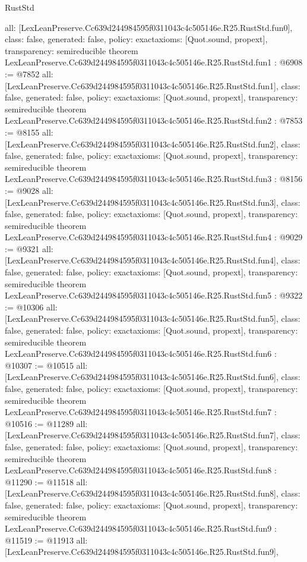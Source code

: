 \begin{lexlean}{RustStd}
\begin{coremodule}
{  all: [LexLeanPreserve.Cc639d244984595f0311043c4c505146e.R25.RustStd.fun0],
  class: false,
  generated: false,
  policy: exact{axioms: [Quot.sound, propext]},
  transparency: semireducible
}
theorem LexLeanPreserve.Cc639d244984595f0311043c4c505146e.R25.RustStd.fun1 : @6908 := @7852 {
  all: [LexLeanPreserve.Cc639d244984595f0311043c4c505146e.R25.RustStd.fun1],
  class: false,
  generated: false,
  policy: exact{axioms: [Quot.sound, propext]},
  transparency: semireducible
}
theorem LexLeanPreserve.Cc639d244984595f0311043c4c505146e.R25.RustStd.fun2 : @7853 := @8155 {
  all: [LexLeanPreserve.Cc639d244984595f0311043c4c505146e.R25.RustStd.fun2],
  class: false,
  generated: false,
  policy: exact{axioms: [Quot.sound, propext]},
  transparency: semireducible
}
theorem LexLeanPreserve.Cc639d244984595f0311043c4c505146e.R25.RustStd.fun3 : @8156 := @9028 {
  all: [LexLeanPreserve.Cc639d244984595f0311043c4c505146e.R25.RustStd.fun3],
  class: false,
  generated: false,
  policy: exact{axioms: [Quot.sound, propext]},
  transparency: semireducible
}
theorem LexLeanPreserve.Cc639d244984595f0311043c4c505146e.R25.RustStd.fun4 : @9029 := @9321 {
  all: [LexLeanPreserve.Cc639d244984595f0311043c4c505146e.R25.RustStd.fun4],
  class: false,
  generated: false,
  policy: exact{axioms: [Quot.sound, propext]},
  transparency: semireducible
}
theorem LexLeanPreserve.Cc639d244984595f0311043c4c505146e.R25.RustStd.fun5 : @9322 := @10306 {
  all: [LexLeanPreserve.Cc639d244984595f0311043c4c505146e.R25.RustStd.fun5],
  class: false,
  generated: false,
  policy: exact{axioms: [Quot.sound, propext]},
  transparency: semireducible
}
theorem LexLeanPreserve.Cc639d244984595f0311043c4c505146e.R25.RustStd.fun6 : @10307 := @10515 {
  all: [LexLeanPreserve.Cc639d244984595f0311043c4c505146e.R25.RustStd.fun6],
  class: false,
  generated: false,
  policy: exact{axioms: [Quot.sound, propext]},
  transparency: semireducible
}
theorem LexLeanPreserve.Cc639d244984595f0311043c4c505146e.R25.RustStd.fun7 : @10516 := @11289 {
  all: [LexLeanPreserve.Cc639d244984595f0311043c4c505146e.R25.RustStd.fun7],
  class: false,
  generated: false,
  policy: exact{axioms: [Quot.sound, propext]},
  transparency: semireducible
}
theorem LexLeanPreserve.Cc639d244984595f0311043c4c505146e.R25.RustStd.fun8 : @11290 := @11518 {
  all: [LexLeanPreserve.Cc639d244984595f0311043c4c505146e.R25.RustStd.fun8],
  class: false,
  generated: false,
  policy: exact{axioms: [Quot.sound, propext]},
  transparency: semireducible
}
theorem LexLeanPreserve.Cc639d244984595f0311043c4c505146e.R25.RustStd.fun9 : @11519 := @11913 {
  all: [LexLeanPreserve.Cc639d244984595f0311043c4c505146e.R25.RustStd.fun9],
}
\end{coremodule}
\end{lexlean}
